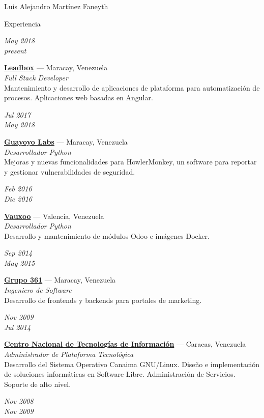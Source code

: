 \documentclass[11pt,letterpaper]{article}
\begin{document}
\begin{cv}{Luis Alejandro Mart\'inez Faneyth}
\begin{cvlist}{Experiencia}
\item[{\parbox[t]{6em}{\textit{\large{May 2018\\present}}}}]{
	\parbox[t]{\linewidth}{
		\textbf{\href{http://leadboxhq.com}{Leadbox}} --- Maracay, Venezuela\\
		\textit{Full Stack Developer}\\
		\footnotesize{Mantenimiento y desarrollo de aplicaciones de plataforma para automatización de procesos. Aplicaciones web basadas en Angular.}
	}
}
\item[{\parbox[t]{6em}{\textit{\large{Jul 2017\\May 2018}}}}]{
	\parbox[t]{\linewidth}{
		\textbf{\href{https://guayoyolabs.com}{Guayoyo Labs}} --- Maracay, Venezuela\\
		\textit{Desarrollador Python}\\
		\footnotesize{Mejoras y nuevas funcionalidades para HowlerMonkey, un software para reportar y gestionar vulnerabilidades de seguridad.}
	}
}
\item[{\parbox[t]{6em}{\textit{\large{Feb 2016\\Dic 2016}}}}]{
	\parbox[t]{\linewidth}{
		\textbf{\href{https://www.vauxoo.com}{Vauxoo}} --- Valencia, Venezuela\\
		\textit{Desarrollador Python}\\
		\footnotesize{Desarrollo y mantenimiento de m\'odulos Odoo e im\'agenes Docker.}
	}
}
\item[{\parbox[t]{6em}{\textit{\large{Sep 2014\\May 2015}}}}]{
	\parbox[t]{\linewidth}{
		\textbf{\href{http://www.grupo361.com}{Grupo 361}} --- Maracay, Venezuela\\
		\textit{Ingeniero de Software}\\
		\footnotesize{Desarrollo de frontends y backends para portales de marketing.}
	}
}
\item[{\parbox[t]{6em}{\textit{\large{Nov 2009\\Jul 2014}}}}]{
	\parbox[t]{\linewidth}{
		\textbf{\href{https://www.cnti.gob.ve}{Centro Nacional de Tecnolog\'ias de Informaci\'on}} --- Caracas, Venezuela\\
		\textit{Administrador de Plataforma Tecnol\'ogica}\\
		\footnotesize{Desarrollo del Sistema Operativo Canaima GNU/Linux. Dise\~no e implementaci\'on de soluciones inform\'aticas en Software Libre. Administraci\'on de Servicios. Soporte de alto nivel.}
	}
}
\item[{\parbox[t]{6em}{\textit{\large{Nov 2008\\Nov 2009}}}}]{
}
\end{cvlist}
\end{cv}
\end{document}
